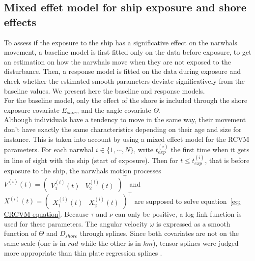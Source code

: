 \documentclass[11pt]{article}
\newcommand {\1}{\mathbb{1}}
\begin{document}

\subsection{Mixed effet model for ship exposure and shore effects}
\label{subsection: ship exposure effect}


To assess if the exposure to the ship has a significative effect on the narwhals movement, a baseline model is first fitted only on the data before exposure, to get an estimation on how the narwhals move when they are not exposed to the disturbance. Then, a response model is fitted on the data during exposure and check whether the estimated smooth parameters deviate significatively from the baseline values. We present here the baseline and response models.\\

For the baseline model, only the effect of the shore is included through the shore exposure covariate $E_{shore}$ and the angle covariate $\Theta$.\\
Although individuals have a tendency to move in the same way, their movement don't have exactly the same characteristics depending on their age and size for instance. This is taken into account by using a mixed effect model for the RCVM parameters.
For each narwhal $i \in \{1, \cdots, N\}$, write $t_{exp}^{(i)}$ the first time when it gets in line of sight with the ship (start of exposure). Then for $t \leq t_{exp}^{(i)}$, that is before exposure to the ship, the narwhals motion processes $V^{(i)}(t)=\begin{pmatrix} V^{(i)}_1(t) & V^{(i)}_2(t) \end{pmatrix}^\top$ and $X^{(i)}(t)=\begin{pmatrix} X^{(i)}_1(t) & X^{(i)}_2(t) \end{pmatrix}^\top$ are supposed to solve equation~\ref{eq: CRCVM equation}. Because $\tau$ and $\nu$ can only be positive, a log link function is used for these parameters. The angular velocity $\omega$ is expressed as a smooth function of $\Theta$ and $D_{shore}$ through splines. Since both covariates are not on the same scale (one is in $rad$ while the other is in $km$), tensor splines were judged more appropriate than thin plate regression splines \cite{wood_generalized_2017}.\\
\end{document}

